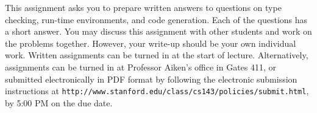 \documentclass[11pt]{article}
\begin{document}


This assignment asks you to prepare written answers to questions on
type checking, run-time environments, and code generation.  Each of
the questions has a short answer.  You may discuss this assignment
with other students and work on the problems together.  However, your
write-up should be your own individual work.  Written assignments can
be turned in at the start of lecture.  Alternatively, assignments can
be turned in at Professor Aiken's office in Gates 411, or submitted
electronically in PDF format by following the electronic submission
instructions at
\texttt{http://www.stanford.edu/class/cs143/policies/submit.html}, by
5:00 PM on the due date.

\bigskip
\bigskip
\end{document}

